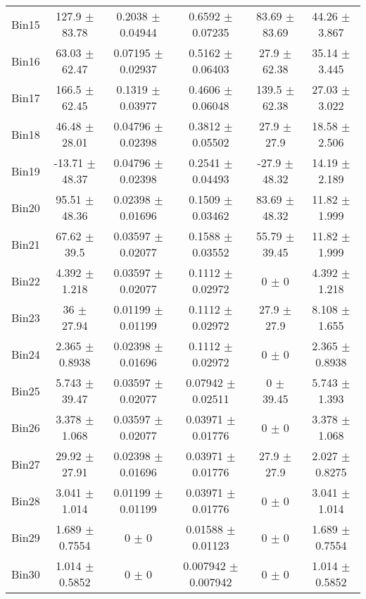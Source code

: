 \begin{tabular}{@{\extracolsep{4pt}}lccccc@{}}
     Bin15 & 127.9 $\pm$ 83.78 & 0.2038 $\pm$ 0.04944 & 0.6592 $\pm$ 0.07235 & 83.69 $\pm$ 83.69 & 44.26 $\pm$ 3.867 \\ 
     Bin16 & 63.03 $\pm$ 62.47 & 0.07195 $\pm$ 0.02937 & 0.5162 $\pm$ 0.06403 & 27.9 $\pm$ 62.38 & 35.14 $\pm$ 3.445 \\ 
     Bin17 & 166.5 $\pm$ 62.45 & 0.1319 $\pm$ 0.03977 & 0.4606 $\pm$ 0.06048 & 139.5 $\pm$ 62.38 & 27.03 $\pm$ 3.022 \\ 
     Bin18 & 46.48 $\pm$ 28.01 & 0.04796 $\pm$ 0.02398 & 0.3812 $\pm$ 0.05502 & 27.9 $\pm$ 27.9 & 18.58 $\pm$ 2.506 \\ 
     Bin19 & -13.71 $\pm$ 48.37 & 0.04796 $\pm$ 0.02398 & 0.2541 $\pm$ 0.04493 & -27.9 $\pm$ 48.32 & 14.19 $\pm$ 2.189 \\ 
     Bin20 & 95.51 $\pm$ 48.36 & 0.02398 $\pm$ 0.01696 & 0.1509 $\pm$ 0.03462 & 83.69 $\pm$ 48.32 & 11.82 $\pm$ 1.999 \\ 
     Bin21 & 67.62 $\pm$ 39.5 & 0.03597 $\pm$ 0.02077 & 0.1588 $\pm$ 0.03552 & 55.79 $\pm$ 39.45 & 11.82 $\pm$ 1.999 \\ 
     Bin22 & 4.392 $\pm$ 1.218 & 0.03597 $\pm$ 0.02077 & 0.1112 $\pm$ 0.02972 & 0 $\pm$ 0 & 4.392 $\pm$ 1.218 \\ 
     Bin23 & 36 $\pm$ 27.94 & 0.01199 $\pm$ 0.01199 & 0.1112 $\pm$ 0.02972 & 27.9 $\pm$ 27.9 & 8.108 $\pm$ 1.655 \\ 
     Bin24 & 2.365 $\pm$ 0.8938 & 0.02398 $\pm$ 0.01696 & 0.1112 $\pm$ 0.02972 & 0 $\pm$ 0 & 2.365 $\pm$ 0.8938 \\ 
     Bin25 & 5.743 $\pm$ 39.47 & 0.03597 $\pm$ 0.02077 & 0.07942 $\pm$ 0.02511 & 0 $\pm$ 39.45 & 5.743 $\pm$ 1.393 \\ 
     Bin26 & 3.378 $\pm$ 1.068 & 0.03597 $\pm$ 0.02077 & 0.03971 $\pm$ 0.01776 & 0 $\pm$ 0 & 3.378 $\pm$ 1.068 \\ 
     Bin27 & 29.92 $\pm$ 27.91 & 0.02398 $\pm$ 0.01696 & 0.03971 $\pm$ 0.01776 & 27.9 $\pm$ 27.9 & 2.027 $\pm$ 0.8275 \\ 
     Bin28 & 3.041 $\pm$ 1.014 & 0.01199 $\pm$ 0.01199 & 0.03971 $\pm$ 0.01776 & 0 $\pm$ 0 & 3.041 $\pm$ 1.014 \\ 
     Bin29 & 1.689 $\pm$ 0.7554 & 0 $\pm$ 0 & 0.01588 $\pm$ 0.01123 & 0 $\pm$ 0 & 1.689 $\pm$ 0.7554 \\ 
     Bin30 & 1.014 $\pm$ 0.5852 & 0 $\pm$ 0 & 0.007942 $\pm$ 0.007942 & 0 $\pm$ 0 & 1.014 $\pm$ 0.5852 \\ 
\hline\hline
  \end{tabular}

